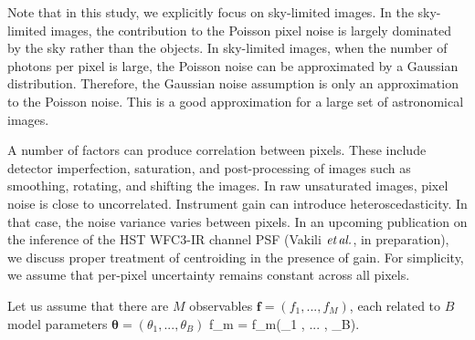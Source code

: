 
Note that in this study, we explicitly focus on sky-limited images. In the sky-limited images, the contribution 
to the Poisson pixel noise is largely dominated by the sky rather than the objects. In sky-limited images, when the number of photons per pixel is large, the Poisson noise can be approximated by a Gaussian distribution. Therefore, the Gaussian noise assumption is only an approximation to the Poisson noise. This is a good approximation for a large set of astronomical images. 

A number of factors can produce correlation between pixels. These include detector imperfection, saturation, and post-processing of images such as smoothing, rotating, and shifting the images. In raw unsaturated images, pixel noise is close to uncorrelated. Instrument gain can introduce heteroscedasticity. In that case, the noise variance varies between pixels. In an upcoming publication on the inference of the HST WFC3-IR channel PSF (Vakili $\emph{et\,al.}$, in preparation), we discuss proper treatment of centroiding in the presence of gain. For simplicity, we assume that per-pixel uncertainty remains constant across all pixels. 


Let us assume that there are $M$ observables $\mathbf{f} = (f_{1}, ... , f_{M})$, each
related to $B$ model parameters $\boldsymbol{\mathbf{\theta}} = (\theta_{1} , ... , \theta_{B})$ 
\beq
f_{m} = f_{m}(\theta_{1} , ... , \theta_{B}).
\label{genmodel}
\eeq

